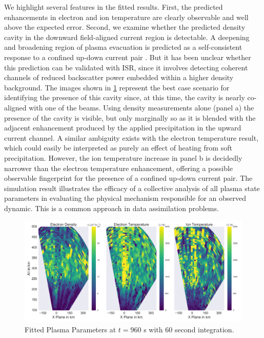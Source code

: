 \documentclass[draft,ras]{agutex}
\begin{document}
\begin{article}
We highlight several features in the fitted results. First, the predicted enhancements in electron and ion temperature are clearly observable and well above the expected error. Second, we examine whether the predicted density cavity in the downward field-aligned current region is  detectable. A deepening and broadening region of plasma evacuation is predicted as a self-consistent response to a confined up-down current pair \citep[e.g.,][]{cran;cavity}.  But it has been unclear whether this prediction can be validated with ISR, since it involves detecting coherent channels of reduced backscatter power embedded within a higher density background.
The images shown in \ref{fig:fplparamst60} represent the best case scenario for identifying the presence of this cavity since, at this time, the cavity is nearly co-aligned with one of the beams. 
Using density measurements alone (panel a) the presence of the cavity is visible, but only marginally so as it is blended with the adjacent  enhancement produced by the applied precipitation in the upward current channel.  A similar ambiguity exists with the electron temperature result, which could easily be interpreted as purely an effect of heating from soft precipitation.   However, the ion temperature increase in panel b is decidedly narrower than the electron temperature enhancement, offering a possible observable fingerprint for the presence of a confined up-down current pair.  The simulation result illustrates the efficacy of a collective analysis of all plasma state parameters in evaluating the physical mechanism responsible for an observed dynamic.  This is a common approach in data assimilation problems.


\begin{figure}[!t]
\centering
\includegraphics[width=6in]{0960_60_int}
\caption{Fitted Plasma Parameters at $t=960$ s with 60 second integration.}
\label{fig:fplparamst60}
\end{figure}


\end{article}
\end{document}
